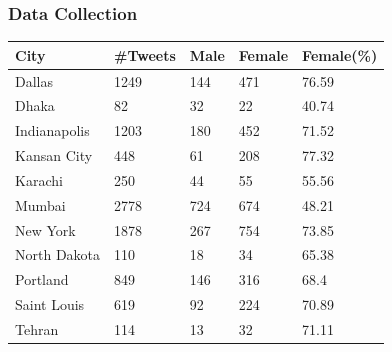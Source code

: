 \documentclass{beamer}
\begin{document}
\begin{frame}
\frametitle{Data Collection}
\centering
\begin{tabular}{|l|l|l|l|l|}
\hline
\rowcolor{LightCyan}
\textbf{City} & \textbf{\#Tweets} & \textbf{Male} & \textbf{Female} & \textbf{Female(\%)}   \\

\hline
Dallas & 1249 & 144 & 471 & 76.59 \\
\hline
Dhaka & 82 & 32 &  22 & 40.74  \\
\hline
Indianapolis & 1203 & 180 & 452 & 71.52  \\
\hline
Kansan City & 448 & 61 & 208 & 77.32  \\
\hline
Karachi & 250 & 44 & 55 & 55.56  \\
\hline
Mumbai & 2778 & 724 & 674 & 48.21  \\
\hline
New York & 1878 & 267 & 754 & 73.85  \\
\hline
North Dakota & 110 & 18 & 34 & 65.38  \\
\hline
Portland & 849 & 146 & 316 & 68.4  \\
\hline
Saint Louis & 619 & 92 & 224 & 70.89  \\
\hline
Tehran & 114 & 13 & 32 & 71.11  \\
\hline


\end{tabular}

\end{frame}
\end{document}
